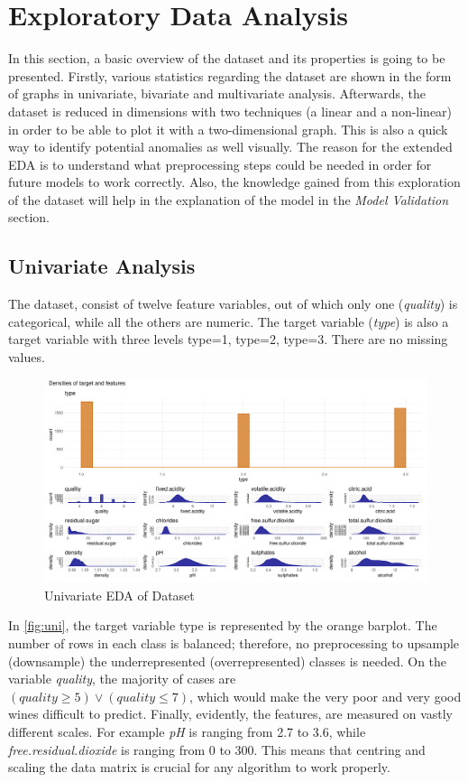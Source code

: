 \documentclass[11pt,twoside]{article}
\numberwithin{Theorem}{section}
\numberwithin{Definition}{section}
\numberwithin{Lemma}{section}
\numberwithin{Algorithm}{section}
\numberwithin{equation}{section}
\begin{document}
\section{Exploratory Data Analysis}
\label{sec:eda}
In this section, a basic overview of the dataset and its properties is going to be presented. Firstly, various statistics regarding the dataset are shown in the form of graphs in univariate, bivariate and multivariate analysis. Afterwards, the dataset is reduced in dimensions with two techniques (a linear and a non-linear) in order to be able to plot it with a two-dimensional graph. This is also a quick way to identify potential anomalies as well visually. The reason for the extended EDA is to understand what preprocessing steps could be needed in order for future models to work correctly. Also, the knowledge gained from this exploration of the dataset will help in the explanation of the model in the \textit{Model Validation} section.
\subsection{Univariate Analysis}
\label{sec:univariate}
The dataset, consist of twelve feature variables, out of which only one (\textit{quality}) is categorical, while all the others are numeric. The target variable (\textit{type}) is also a target variable with three levels \textsf{type=1, type=2, type=3}. There are no missing values.
\vspace*{1em}
\begin{figure}[!h]
\centering
\includegraphics[width=\textwidth]{./output/1.h.univariate-analysis.pdf}
\caption{Univariate EDA of Dataset}
\label{fig:uni}
\end{figure}
\vspace{2em}
In \autoref{fig:uni}, the target variable type is represented by the orange barplot. The number of rows in each class is balanced; therefore, no preprocessing to upsample (downsample) the underrepresented (overrepresented) classes is needed. On the variable \textit{quality}, the majority of cases are \\
 $(quality\geq5) \lor (quality\leq7)$, which would make the very poor and very good wines difficult to predict. Finally, evidently, the features, are measured on vastly different scales. For example \textit{pH} is ranging from 2.7 to 3.6, while \textit{free.residual.dioxide} is ranging from 0 to 300. This means that centring and scaling the data matrix is crucial for any algorithm to work properly.
\end{document}
